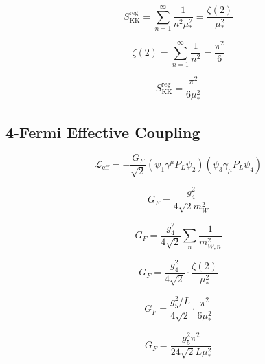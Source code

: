 \documentclass[11pt,a4paper]{article}
\theoremstyle{definition}
\begin{document}
\begin{equation}
\label{eq:kk_reg_2}
S_{\text{KK}}^{\text{reg}} = \sum_{n=1}^{\infty}\frac{1}{n^2\mu_*^2} = \frac{\zeta(2)}{\mu_*^2}
\end{equation}

\begin{equation}
\label{eq:kk_reg_3}
\zeta(2) = \sum_{n=1}^{\infty}\frac{1}{n^2} = \frac{\pi^2}{6}
\end{equation}

\begin{equation}
\label{eq:kk_reg_4}
S_{\text{KK}}^{\text{reg}} = \frac{\pi^2}{6\mu_*^2}
\end{equation}

\subsection{4-Fermi Effective Coupling}
\label{subsec:4fermi}

\begin{equation}
\label{eq:4fermi_1}
\mathcal{L}_{\text{eff}} = -\frac{G_F}{\sqrt{2}}(\bar{\psi}_1\gamma^\mu P_L\psi_2)(\bar{\psi}_3\gamma_\mu P_L\psi_4)
\end{equation}

\begin{equation}
\label{eq:4fermi_2}
G_F = \frac{g_4^2}{4\sqrt{2}m_W^2}
\end{equation}

\begin{equation}
\label{eq:4fermi_3}
G_F = \frac{g_4^2}{4\sqrt{2}}\sum_n\frac{1}{m_{W,n}^2}
\end{equation}

\begin{equation}
\label{eq:4fermi_4}
G_F = \frac{g_4^2}{4\sqrt{2}}\cdot\frac{\zeta(2)}{\mu_*^2}
\end{equation}

\begin{equation}
\label{eq:4fermi_5}
G_F = \frac{g_5^2/L}{4\sqrt{2}}\cdot\frac{\pi^2}{6\mu_*^2}
\end{equation}

\begin{equation}
\label{eq:4fermi_6}
G_F = \frac{g_5^2\pi^2}{24\sqrt{2}L\mu_*^2}
\end{equation}

\end{document}
